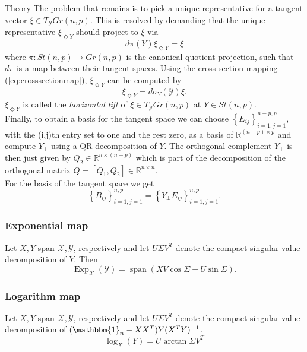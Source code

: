 \begin{chapter}{Theory}
The problem that remains is to pick a unique representative for a tangent vector $\xi\in T_{\mathcal{Y}}Gr(n,p)$.
This is resolved by demanding that the unique representative $\xi_{\Diamond Y}$ should project to $\xi$ via
\begin{equation}
d\pi(Y)\xi_{\Diamond Y}=\xi
\end{equation}
where $\pi: St(n,p)\to Gr(n,p)$ is the canonical quotient projection, such that $d\pi$ is a map between their 
tangent spaces. Using the cross section mapping (\ref{eq:crosssectionmap}), $\xi_{\Diamond Y}$ can be computed by
\begin{equation}
\xi_{\Diamond Y} = d\sigma_Y(\mathcal{Y})\xi.
\end{equation}
$\xi_{\Diamond Y}$ is called the \emph{horizontal lift} of $\xi\in T_{\mathcal{Y}}Gr(n,p)$ at $Y\in St(n,p)$.\\

Finally, to obtain a basis for the tangent space we can choose $\left\lbrace E_{ij}\right\rbrace_{i=1,j=1}^{n-p,p}$, with the (i,j)th entry set to one and the rest zero,
as a basis of $\mathbb{R}^{(n-p)\times p}$ and compute $Y_{\bot}$ using a QR decomposition of $Y$. The orthogonal complement $Y_{\bot}$ is then just given by 
$Q_2\in\mathbb{R}^{n\times (n-p)}$ which is part of the decomposition of the orthogonal matrix $Q=[Q_1,Q_2]\in\mathbb{R}^{n\times n}$.\\
For the basis of the tangent space we get 
\begin{equation}
    \left\lbrace B_{ij}\right\rbrace_{i=1,j=1}^{n,p}=\left\lbrace Y_{\bot}E_{ij}\right\rbrace_{i=1,j=1}^{n,p}.
\end{equation}




\subsubsection{Exponential map} %
\label{ssub:Exponential map}
Let $X, Y$ span $\mathcal{X}, \mathcal{Y}$, respectively and let $U\Sigma V^{T}$ denote the compact singular value decomposition of $Y$. Then
\begin{equation}
    \operatorname{Exp}_{\mathcal{X}}(\mathcal{Y})=\operatorname{span}\left( XV\cos\Sigma + U\sin\Sigma\right).
\end{equation}

\subsubsection{Logarithm map} %
\label{ssub:Logarithm map}
Let $X, Y$ span $\mathcal{X}, \mathcal{Y}$, respectively and let $U\Sigma V^{T}$ denote the compact singular value decomposition of $(\mathbbm{1}_n-XX^T)Y(X^TY)^{-1}$.
\begin{equation}
\log_X(Y) = U\arctan\Sigma V^T 
\end{equation}


\end{chapter}
